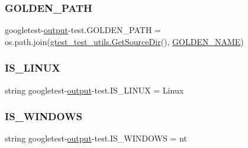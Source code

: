 \subsubsection{\texorpdfstring{GOLDEN\_PATH}{GOLDEN\_PATH}}
{\footnotesize\ttfamily googletest-\/\mbox{\hyperlink{namespacegoogletest-output-test_ab3df9ce09186215a36c30454cf282417}{output}}-\/test.\+G\+O\+L\+D\+E\+N\+\_\+\+P\+A\+TH = os.\+path.\+join(\mbox{\hyperlink{namespacegtest__test__utils_aaff66cb0980804d8bd57dc719d4b5518}{gtest\+\_\+test\+\_\+utils.\+Get\+Source\+Dir}}(), \mbox{\hyperlink{namespacegoogletest-output-test_a66b45fb215424c968b479fbf864f1e7f}{G\+O\+L\+D\+E\+N\+\_\+\+N\+A\+ME}})}

\mbox{\label{namespacegoogletest-output-test_a7ff614069cc92eea5943d720b479afd7}} 
\subsubsection{\texorpdfstring{IS\_LINUX}{IS\_LINUX}}
{\footnotesize\ttfamily string googletest-\/\mbox{\hyperlink{namespacegoogletest-output-test_ab3df9ce09186215a36c30454cf282417}{output}}-\/test.\+I\+S\+\_\+\+L\+I\+N\+UX = \textquotesingle{}Linux\textquotesingle{}}

\mbox{\label{namespacegoogletest-output-test_a88183ad6c50d9f025ab11d07e5b4d9ec}} 
\subsubsection{\texorpdfstring{IS\_WINDOWS}{IS\_WINDOWS}}
{\footnotesize\ttfamily string googletest-\/\mbox{\hyperlink{namespacegoogletest-output-test_ab3df9ce09186215a36c30454cf282417}{output}}-\/test.\+I\+S\+\_\+\+W\+I\+N\+D\+O\+WS = \textquotesingle{}nt\textquotesingle{}}

\mbox{\label{namespacegoogletest-output-test_ac8183a857acd7838ccb984117377852e}} 
